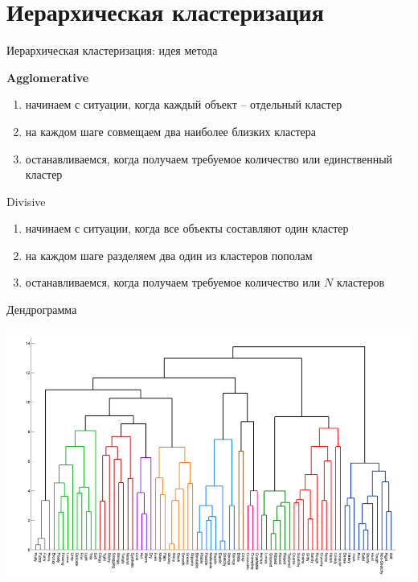\documentclass[10pt,a4paper]{beamer}
\begin{document}

\section{Иерархическая кластеризация}


\begin{frame}{Иерархическая кластеризация: идея метода}

{\bf Agglomerative}
\begin{enumerate}
\item начинаем с ситуации, когда каждый объект -- отдельный кластер
\item на каждом шаге совмещаем два наиболее близких кластера
\item останавливаемся, когда получаем требуемое количество или единственный кластер
\end{enumerate}

\vspace{1em}
Divisive
\begin{enumerate}
\item начинаем с ситуации, когда все объекты составляют один кластер
\item на каждом шаге разделяем два один из кластеров пополам
\item останавливаемся, когда получаем требуемое количество или $N$ кластеров
\end{enumerate}

\end{frame}


\begin{frame}{Дендрограмма}

\begin{center}
\includegraphics[scale=0.3]{images/dendro.png}
\end{center}

\end{frame}
\end{document}
